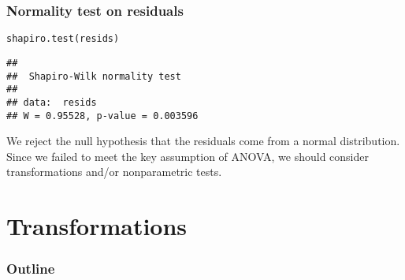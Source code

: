 \documentclass[color=usenames,dvipsnames]{beamer}\usepackage[]{graphicx}\usepackage[]{color}
\makeatletter
\newcommand{\hlstd}[1]{\textcolor[rgb]{0,0,0}{#1}}%
\newcommand{\hlkwd}[1]{\textcolor[rgb]{0.004,0.004,0.506}{#1}}%
\newenvironment{kframe}{%
 \def\at@end@of@kframe{}%
 \ifinner\ifhmode%
  \def\at@end@of@kframe{\end{minipage}}%
  \begin{minipage}{\columnwidth}%
 \fi\fi%
 \def\FrameCommand##1{\hskip\@totalleftmargin \hskip-\fboxsep
 \colorbox{shadecolor}{##1}\hskip-\fboxsep
     \hskip-\linewidth \hskip-\@totalleftmargin \hskip\columnwidth}%
 \MakeFramed {\advance\hsize-\width
   \@totalleftmargin\z@ \linewidth\hsize
   \@setminipage}}%
 {\par\unskip\endMakeFramed%
 \at@end@of@kframe}
\newenvironment{knitrout}{}{} %
\makeatother
\begin{document}
\begin{frame}[fragile]
  \frametitle{Normality test on residuals}
\begin{knitrout}
\color{fgcolor}\begin{kframe}
\begin{alltt}
\hlkwd{shapiro.test}\hlstd{(resids)}
\end{alltt}
\begin{verbatim}
## 
## 	Shapiro-Wilk normality test
## 
## data:  resids
## W = 0.95528, p-value = 0.003596
\end{verbatim}
\end{kframe}
\end{knitrout}
\vspace{0.6cm}
{We reject the null hypothesis that the residuals come from a normal
  distribution.
  \pause
  \vfill 
  Since we failed to meet the key assumption of ANOVA,
  we should consider transformations and/or nonparametric tests.
}  
\end{frame}









\section{Transformations}




\begin{frame}[plain]
 \frametitle{Outline}
 \Large
 \tableofcontents[currentsection]
\end{frame}
\end{document}
